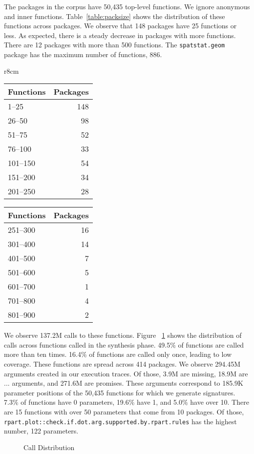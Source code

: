 \documentclass[review,creen,acmsmall]{acmart}
\renewcommand{\c}[1]{\lstinline |#1|\xspace}
\begin{document}
The packages in the corpus have 50,435 top-level functions. We ignore anonymous
and inner functions. Table~\ref{table:packsize} shows the distribution of these
functions across packages. We observe that 148 packages have 25 functions or
less. As expected, there is a steady decrease in packages with more functions.
There are 12 packages with more than 500 functions. The \c{spatstat.geom} package
has the maximum number of functions, 886.

\begin{wraptable}{r}{8cm}
  \vspace{-3mm}
  \small
  \caption{Package Size} \label{table:packsize}
  \centering
  \begin{tabular}{lr}
    \toprule
    \bf Functions&\bf Packages\\
    \midrule
    1--25&148\\
    26--50&98\\
    51--75&52\\
    76--100&33\\
    101--150&54\\
    151--200&34\\
    201--250&28\\
    \bottomrule
  \end{tabular}
  \quad
  \begin{tabular}{lr}
    \toprule
    \bf Functions&\bf Packages\\
    \midrule
    251--300&16\\
    301--400&14\\
    401--500&7\\
    501--600&5\\
    601--700&1\\
    701--800&4\\
    801--900&2\\
    \bottomrule
  \end{tabular}
\end{wraptable}


We observe 137.2M calls to these functions. Figure ~\ref{fig:callDist} shows the
distribution of calls across functions called in the synthesis
phase. 49.5\% of functions are called more than ten times. 16.4\% of functions are
called only once, leading to low coverage. These functions are spread across 414
packages.
We observe 294.45M arguments created in our execution traces. Of those, 3.9M are
missing, 18.9M are $...$ arguments, and 271.6M are promises. These arguments
correspond to 185.9K parameter positions of the 50,435 functions for which we
generate signatures.
7.3\% of functions have 0 parameters, 19.6\% have 1, and 5.0\% have over 10. There
are 15 functions with over 50 parameters that come from 10 packages. Of those,
\c{rpart.plot::check.if.dot.arg.supported.by.rpart.rules} has the highest number,
122 parameters.
%
\begin{figure}[!h]
  \centering
  
  \caption{Call Distribution}
  \label{fig:callDist}
\end{figure}
%
\end{document}
